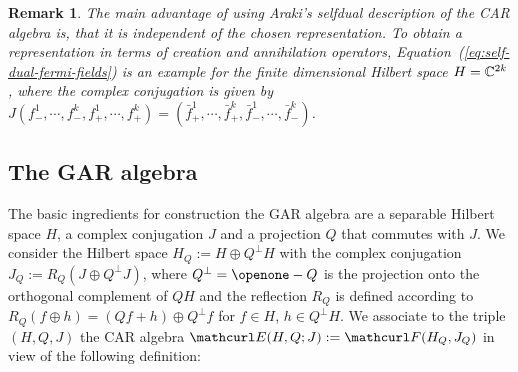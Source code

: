 \documentclass[pra,twoside,amsmath,amsfonts,amssymb,superscriptaddress,showpacs]{revtex4}
\newtheorem{rem}[thm]{Remark}
\def\7#1{{\Bbb #1}}
\def\9#1{{\mathcurl #1}}
\def\I{\openone}
\newcommand{\CAR}[2]{\9F(#1,#2)}
\newcommand{\ENV}[3]{\9E(#1,#3;#2)}
\begin{document}
\begin{rem}\em
The main advantage of using Araki's selfdual description of the CAR algebra  is, that it is
independent of the chosen representation. To obtain a representation in terms of creation and
annihilation operators, Equation~(\ref{eq:self-dual-fermi-fields}) is an example for the finite
dimensional Hilbert space $H=\7C^{2k}$, where the complex conjugation is given by
$J(f_-^1,\cdots,f_-^k,f_+^1,\cdots,f_+^k)=(\bar f_+^1,\cdots,\bar f_+^k,\bar
f_-^1,\cdots,\bar f_-^k)$.
\end{rem}

\subsection{The GAR algebra}
\label{subsec:GAR}
The basic ingredients for construction the GAR algebra are a separable Hilbert space $H$, a complex
conjugation $J$ and a projection $Q$ that commutes with $J$. We consider the Hilbert space
$H_Q:=H\oplus Q^\perp H$ with the complex conjugation $J_Q:= R_Q(J\oplus Q^\perp J)$, where
$Q^\perp=\I-Q$ is the projection onto the orthogonal complement of $QH$ and the reflection $R_Q$ is
defined according to $R_Q(f\oplus h)=(Qf+h)\oplus Q^\perp f$ for $f\in H$, $h\in
Q^\perp H$. We associate to the triple $(H,Q,J)$ the CAR algebra
$\ENV{H}{J}{Q}:=\CAR{H_Q}{J_Q}$ in view of the following definition:
\end{document}
